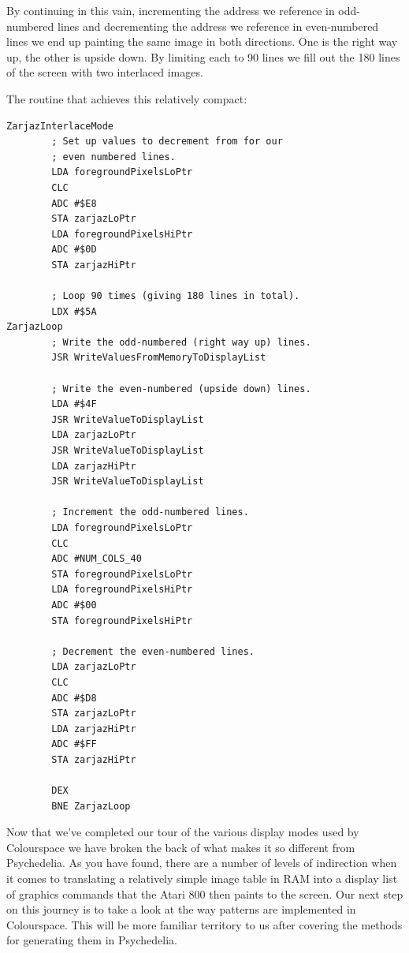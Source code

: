 By continuing in this vain, incrementing the address we reference in odd-numbered
lines and decrementing the address we reference in even-numbered lines we end up painting the same image in both directions. One is the
right way up, the other is upside down. By limiting each to 90 lines we fill out the 180 lines of the screen with two interlaced images.

The routine that achieves this relatively compact:
\clearpage
\begin{lstlisting}
ZarjazInterlaceMode   
        ; Set up values to decrement from for our
        ; even numbered lines.
        LDA foregroundPixelsLoPtr
        CLC 
        ADC #$E8
        STA zarjazLoPtr
        LDA foregroundPixelsHiPtr
        ADC #$0D
        STA zarjazHiPtr

        ; Loop 90 times (giving 180 lines in total).
        LDX #$5A
ZarjazLoop   
        ; Write the odd-numbered (right way up) lines.
        JSR WriteValuesFromMemoryToDisplayList

        ; Write the even-numbered (upside down) lines.
        LDA #$4F
        JSR WriteValueToDisplayList
        LDA zarjazLoPtr
        JSR WriteValueToDisplayList
        LDA zarjazHiPtr
        JSR WriteValueToDisplayList

        ; Increment the odd-numbered lines.
        LDA foregroundPixelsLoPtr
        CLC 
        ADC #NUM_COLS_40
        STA foregroundPixelsLoPtr
        LDA foregroundPixelsHiPtr
        ADC #$00
        STA foregroundPixelsHiPtr

        ; Decrement the even-numbered lines.
        LDA zarjazLoPtr
        CLC 
        ADC #$D8
        STA zarjazLoPtr
        LDA zarjazHiPtr
        ADC #$FF
        STA zarjazHiPtr

        DEX 
        BNE ZarjazLoop
\end{lstlisting}

Now that we've completed our tour of the various display modes used by Colourspace we have broken the back of
what makes it so different from Psychedelia. As you have found, there are a number of levels of indirection
when it comes to translating a relatively simple image table in RAM into a display list of graphics commands that
the Atari 800 then paints to the screen. Our next step on this journey is to take a look at the way patterns
are implemented in Colourspace. This will be more familiar territory to us after covering the methods for generating
them in Psychedelia.
\clearpage
